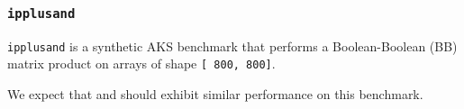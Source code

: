 \subsubsection{\tt ipplusand}
\label{benchmarkiplusand}

{\tt ipplusand} is a synthetic AKS benchmark that performs
a Boolean-Boolean ({\apl B\qplus\qdot\qand\qtran\0B}) matrix product on 
arrays of shape {\tt [ 800, 800]}.

We expect that \wlf and \awlf should exhibit similar performance
on this benchmark.
